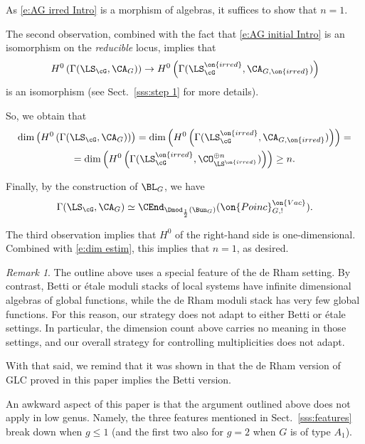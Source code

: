 \documentclass[9pt]{amsart}
\theoremstyle{remark}
\newtheorem{rem}[subsubsection]{Remark}
\theoremstyle{definition}
\theoremstyle{remark}
\newcommand{\secref}[1]{Sect.~\ref{#1}}
\numberwithin{equation}{section}
\begin{document}
As \eqref{e:AG irred Intro} is a morphism of algebras, it 
suffices to show that $n=1$. 

\sssec{} \label{sss:dim count}

The second observation, combined with the fact that \eqref{e:AG initial Intro} is an isomorphism on the 
\emph{reducible} locus, implies that
$$H^0\left(\Gamma(\LS_\cG,\CA_G)\right)\to H^0\left(\Gamma(\LS^{\on{irred}}_\cG,\CA_{G,\on{irred}})\right)$$
is an isomorphism (see \secref{sss:step 1} for more details).

\medskip

So, we obtain that 
\begin{multline} \label{e:dim estim}
\dim\left(H^0\left(\Gamma(\LS_\cG,\CA_G)\right)\right)=\dim\left(H^0\left(\Gamma(\LS^{\on{irred}}_\cG,\CA_{G,\on{irred}})\right)\right)=\\
=\dim\left(H^0\left(\Gamma(\LS^{\on{irred}}_\cG,\CO^{\oplus n}_{\LS^{\on{irred}}})\right)\right)\geq n.
\end{multline}

\sssec{} \label{sss:main step}

Finally, by the construction of $\BL_G$, we have
$$\Gamma(\LS_\cG,\CA_G)\simeq \CEnd_{\Dmod_{\frac{1}{2}}(\Bun_G)}(\on{Poinc}^{\on{Vac}}_{G,!}).$$

The third observation implies that $H^0$ of the right-hand side is one-dimensional. Combined with \eqref{e:dim estim}, this implies that $n=1$,
as desired. 

\begin{rem}

The outline above uses a special 
feature of the de Rham setting. By contrast, Betti or
\'etale moduli stacks of local systems have infinite dimensional algebras
of global functions, while the de Rham moduli stack has very
few global functions.
For this reason, our strategy does not adapt to either Betti or \'etale settings.
In particular, the dimension count above carries no meaning in those settings, and
our overall strategy for controlling multiplicities does not adapt.

\medskip

With that said, we remind that it was shown in \cite[Theorem 3.5.2]{GLC1} that the de Rham version of GLC
proved in this paper implies the Betti version.

\end{rem}

 \label{sss:imperfect1}

An awkward aspect of this paper is that the argument outlined above does not apply in low genus. Namely, the three features 
mentioned in \secref{sss:features} break down when $g\leq 1$ (and the first two also for $g=2$ when $G$ is of type $A_1$).  
\end{document}
